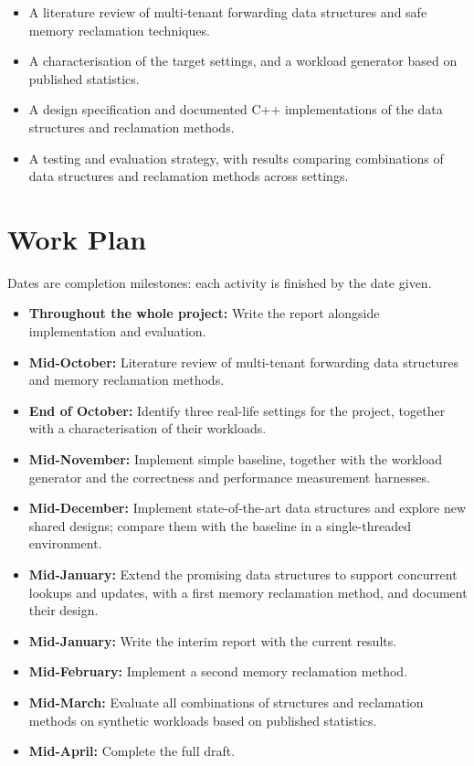 \documentclass[11pt]{article}
\begin{document}
\begin{itemize}
  \item A literature review of multi-tenant forwarding data structures and safe memory reclamation
  techniques.
  \item A characterisation of the target settings, and a workload generator based on published
  statistics.
  \item A design specification and documented C++ implementations of the data structures and
  reclamation methods.
  \item A testing and evaluation strategy, with results comparing combinations of data structures
  and reclamation methods across settings.
\end{itemize}

\clearpage
\section{Work Plan}

\noindent Dates are completion milestones: each activity is finished by the date given.

\begin{itemize}
  \item \textbf{Throughout the whole project:} Write the report alongside implementation and
  evaluation.
  \item \textbf{Mid-October:} Literature review of multi-tenant forwarding data structures and
  memory reclamation methods.
  \item \textbf{End of October:} Identify three real-life settings for the project, together with a
  characterisation of their workloads.
  \item \textbf{Mid-November:} Implement simple baseline, together with the workload generator and
  the correctness and performance measurement harnesses.
  \item \textbf{Mid-December:} Implement state-of-the-art data structures and explore new shared
  designs; compare them with the baseline in a single-threaded environment.
  \item \textbf{Mid-January:} Extend the promising data structures to support
  concurrent lookups and updates, with a first memory reclamation method, and document their
  design.
  \item \textbf{Mid-January:} Write the interim report with the current results.
  \item \textbf{Mid-February:} Implement a second memory reclamation method.
  \item \textbf{Mid-March:} Evaluate all combinations of structures and reclamation methods on
  synthetic workloads based on published statistics.
  \item \textbf{Mid-April:} Complete the full draft.
\end{itemize}
\end{document}
